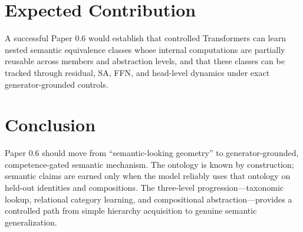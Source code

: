 \documentclass[10pt]{article}
\begin{document}
\section{Expected Contribution}

A successful Paper 0.6 would establish that controlled Transformers can learn nested semantic equivalence classes whose internal computations are partially reusable across members and abstraction levels, and that these classes can be tracked through residual, SA, FFN, and head-level dynamics under exact generator-grounded controls.

\section{Conclusion}

Paper 0.6 should move from ``semantic-looking geometry'' to generator-grounded, competence-gated semantic mechanism. The ontology is known by construction; semantic claims are earned only when the model reliably uses that ontology on held-out identities and compositions. The three-level progression---taxonomic lookup, relational category learning, and compositional abstraction---provides a controlled path from simple hierarchy acquisition to genuine semantic generalization.
\end{document}
